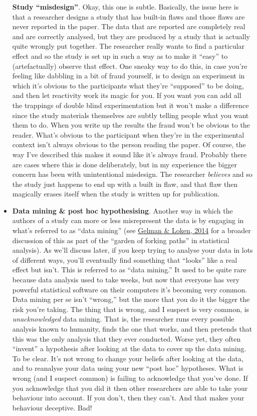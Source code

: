 \documentclass[
]{book}
\begin{document}
\begin{itemize}
  {\textbf{Study ``misdesign''}}. Okay, this one is subtle. Basically, the issue here is that a researcher designs a study that has built-in flaws and those flaws are never reported in the paper. The data that are reported are completely real and are correctly analysed, but they are produced by a study that is actually quite wrongly put together. The researcher really wants to find a particular effect and so the study is set up in such a way as to make it ``easy'' to (artefactually) observe that effect. One sneaky way to do this, in case you're feeling like dabbling in a bit of fraud yourself, is to design an experiment in which it's obvious to the participants what they're ``supposed'' to be doing, and then let reactivity work its magic for you. If you want you can add all the trappings of double blind experimentation but it won't make a difference since the study materials themselves are subtly telling people what you want them to do. When you write up the results the fraud won't be obvious to the reader. What's obvious to the participant when they're in the experimental context isn't always obvious to the person reading the paper. Of course, the way I've described this makes it sound like it's always fraud. Probably there are cases where this is done deliberately, but in my experience the bigger concern has been with unintentional misdesign. The researcher \emph{believes} and so the study just happens to end up with a built in flaw, and that flaw then magically erases itself when the study is written up for publication.
\item
  {\textbf{Data mining \& post hoc hypothesising}}. Another way in which the authors of a study can more or less misrepresent the data is by engaging in what's referred to as ``data mining'' (see \protect\hyperlink{ref-Gelman2014}{Gelman \& Loken, 2014} for a broader discussion of this as part of the {``garden of forking paths''} in statistical analysis). As we'll discuss later, if you keep trying to analyse your data in lots of different ways, you'll eventually find something that ``looks'' like a real effect but isn't. This is referred to as ``data mining.'' It used to be quite rare because data analysis used to take weeks, but now that everyone has very powerful statistical software on their computers it's becoming very common. Data mining per se isn't ``wrong,'' but the more that you do it the bigger the risk you're taking. The thing that is wrong, and I suspect is very common, is \emph{unacknowledged} data mining. That is, the researcher runs every possible analysis known to humanity, finds the one that works, and then pretends that this was the only analysis that they ever conducted. Worse yet, they often ``invent'' a hypothesis after looking at the data to cover up the data mining. To be clear. It's not wrong to change your beliefs after looking at the data, and to reanalyse your data using your new ``post hoc'' hypotheses. What is wrong (and I suspect common) is failing to acknowledge that you've done. If you acknowledge that you did it then other researchers are able to take your behaviour into account. If you don't, then they can't. And that makes your behaviour deceptive. Bad!

\end{itemize}
\end{document}
